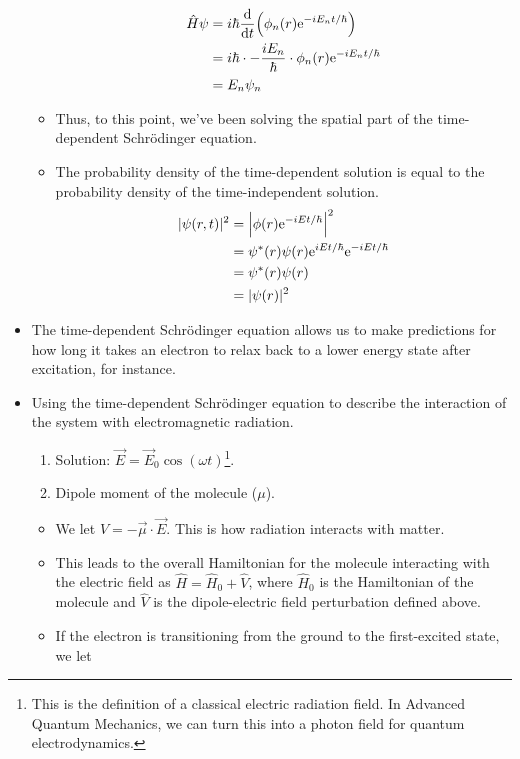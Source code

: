 \documentclass[../notes.tex]{subfiles}
\begin{document}
\begin{itemize}
\begin{itemize}
        \begin{align*}
            \hat{H}\psi &= i\hbar\dv{t}(\phi_n(r)\e[-iE_nt/\hbar])\\
            &= i\hbar\cdot-\frac{iE_n}{\hbar}\cdot\phi_n(r)\e[-iE_nt/\hbar]\\
            &= E_n\psi_n
        \end{align*}
        \item Thus, to this point, we've been solving the spatial part of the time-dependent Schr\"{o}dinger equation.
        \item The probability density of the time-dependent solution is equal to the probability density of the time-independent solution.
        \begin{align*}
            |\psi(r,t)|^2 &= \left| \phi(r)\e[-iEt/\hbar] \right|^2\\
            &= \psi^*(r)\psi(r)\e[iEt/\hbar]\e[-iEt/\hbar]\\
            &= \psi^*(r)\psi(r)\\
            &= |\psi(r)|^2
        \end{align*}
    \end{itemize}
    \item The time-dependent Schr\"{o}dinger equation allows us to make predictions for how long it takes an electron to relax back to a lower energy state after excitation, for instance.
    \item Using the time-dependent Schr\"{o}dinger equation to describe the interaction of the system with electromagnetic radiation.
    \begin{enumerate}
        \item Solution: $\vec{E}=\vec{E}_0\cos(\omega t)$\footnote{This is the definition of a classical electric radiation field. In Advanced Quantum Mechanics, we can turn this into a photon field for quantum electrodynamics.}.
        \item Dipole moment of the molecule ($\mu$).
    \end{enumerate}
    \begin{itemize}
        \item We let $\hat{V}=-\vec{\mu}\cdot\vec{E}$. This is how radiation interacts with matter.
        \item This leads to the overall Hamiltonian for the molecule interacting with the electric field as $\hat{H}=\hat{H}_0+\hat{V}$, where $\hat{H}_0$ is the Hamiltonian of the molecule and $\hat{V}$ is the dipole-electric field perturbation defined above.
        \item If the electron is transitioning from the ground to the first-excited state, we let

\end{itemize}
\end{itemize}
\end{document}
